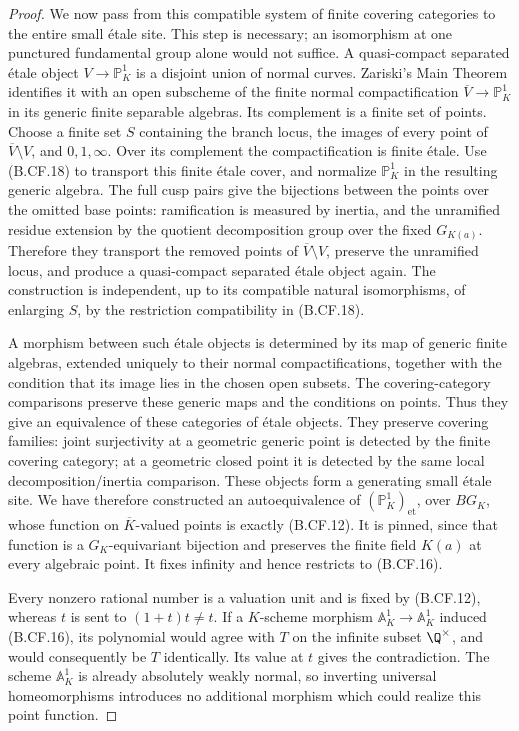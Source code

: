 \begin{proof}
We now pass from this compatible system of finite covering
categories to the entire small étale site. This step is necessary;
an isomorphism at one punctured fundamental group alone would
not suffice. A quasi-compact separated étale object
\(V\to\mathbb P^1_K\) is a disjoint union of normal curves.
Zariski's Main Theorem identifies it with an open subscheme of
the finite normal compactification \(\overline V\to\mathbb P^1_K\)
in its generic finite separable algebras. Its complement is a
finite set of points. Choose a finite set \(S\) containing the
branch locus, the images of every point of
\(\overline V\setminus V\), and \(0,1,\infty\).
Over its complement the compactification is finite étale.
Use (B.CF.18) to transport this
finite étale cover, and normalize \(\mathbb P^1_K\) in the
resulting generic algebra. The full cusp pairs give the
bijections between the points over the omitted base points:
ramification is measured by inertia, and the unramified residue
extension by the quotient decomposition group over the fixed
\(G_{K(a)}\). Therefore they transport the removed points of
\(\overline V\setminus V\), preserve the unramified locus, and
produce a quasi-compact separated étale object again.
The construction is independent, up to its compatible natural
isomorphisms, of enlarging \(S\), by the restriction
compatibility in (B.CF.18).

A morphism between such étale objects is determined by its map
of generic finite algebras, extended uniquely to their normal
compactifications, together with the condition that its image
lies in the chosen open subsets. The covering-category
comparisons preserve these generic maps and the conditions on
points. Thus they give an equivalence of these categories of
étale objects. They preserve covering families: joint
surjectivity at a geometric generic point is detected by the
finite covering category; at a geometric closed point it is
detected by the same local decomposition/inertia comparison.
These objects form a generating small étale site. We have
therefore constructed an autoequivalence of
\((\mathbb P^1_K)_{\mathrm{et}}\), over \(BG_K\), whose
function on \(\overline K\)-valued points is exactly (B.CF.12). It is pinned,
since that function is a \(G_K\)-equivariant bijection and
preserves the finite field \(K(a)\) at every algebraic point.
It fixes infinity and hence restricts to (B.CF.16).

Every nonzero rational number is a valuation unit and is fixed
by (B.CF.12), whereas \(t\) is sent to \((1+t)t\ne t\).
If a \(K\)-scheme morphism \(\mathbb A^1_K\to\mathbb A^1_K\)
induced (B.CF.16), its polynomial would agree with \(T\) on the
infinite subset \(\Q^\times\), and would consequently be \(T\)
identically. Its value at \(t\) gives the contradiction.
The scheme \(\mathbb A^1_K\) is already absolutely weakly
normal, so inverting universal homeomorphisms introduces no
additional morphism which could realize this point function.
\end{proof}

